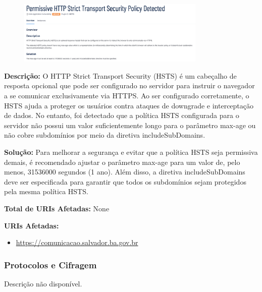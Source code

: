 \documentclass[a4paper,12pt]{article}
\begin{document}
\begin{enumerate}
                        \begin{figure}[h!]
                        \centering
                        \includegraphics[width=0.8\textwidth]{assets/images-was/Vulnerabilidades Relacionadas a Configurações de Segurança HTTP E TLS/Permissive HTTP Strict Transport Security Policy Detected.png}
                        \end{figure}
                        \FloatBarrier
                        \textbf{Descrição:} O HTTP Strict Transport Security (HSTS) é um cabeçalho de resposta opcional que pode ser configurado no servidor para instruir o navegador a se comunicar exclusivamente via HTTPS. Ao ser configurado corretamente, o HSTS ajuda a proteger os usuários contra ataques de downgrade e interceptação de dados. No entanto, foi detectado que a política HSTS configurada para o servidor não possui um valor suficientemente longo para o parâmetro max-age ou não cobre subdomínios por meio da diretiva includeSubDomains.

\textbf{Solução:} Para melhorar a segurança e evitar que a política HSTS seja permissiva demais, é recomendado ajustar o parâmetro max-age para um valor de, pelo menos, 31536000 segundos (1 ano). Além disso, a diretiva includeSubDomains deve ser especificada para garantir que todos os subdomínios sejam protegidos pela mesma política HSTS.

\textbf{Total de URIs Afetadas:} None

\textbf{URIs Afetadas:}
\begin{itemize}
    \item \url{https://comunicacao.salvador.ba.gov.br}
\end{itemize}

\end{enumerate}
\subsubsection{Protocolos e Cifragem}
Descrição não disponível.
\end{document}
